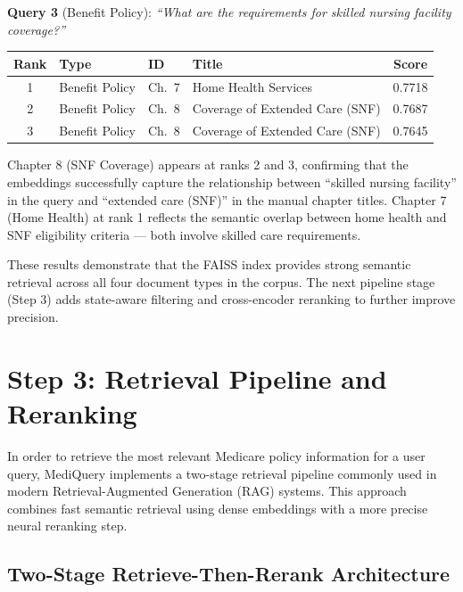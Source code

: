 \documentclass[10pt, letterpaper]{article}
\begin{document}
\textbf{Query 3} (Benefit Policy): \textit{``What are the requirements for skilled
nursing facility coverage?''}

\begin{table}[h]
\centering
\small
\begin{tabular}{@{}clllc@{}}
\toprule
\textbf{Rank} & \textbf{Type} & \textbf{ID} & \textbf{Title} & \textbf{Score} \\
\midrule
1 & Benefit Policy & Ch.\ 7  & Home Health Services           & 0.7718 \\
2 & Benefit Policy & Ch.\ 8  & Coverage of Extended Care (SNF) & 0.7687 \\
3 & Benefit Policy & Ch.\ 8  & Coverage of Extended Care (SNF) & 0.7645 \\
\bottomrule
\end{tabular}
\end{table}

Chapter 8 (SNF Coverage) appears at ranks 2 and 3, confirming that the embeddings
successfully capture the relationship between ``skilled nursing facility'' in the query
and ``extended care (SNF)'' in the manual chapter titles. Chapter 7 (Home Health) at
rank 1 reflects the semantic overlap between home health and SNF eligibility criteria
--- both involve skilled care requirements.

These results demonstrate that the FAISS index provides strong semantic retrieval
across all four document types in the corpus. The next pipeline stage (Step 3) adds
state-aware filtering and cross-encoder reranking to further improve precision.


\newpage
\section{Step 3: Retrieval Pipeline and Reranking}

In order to retrieve the most relevant Medicare policy information for a user query, MediQuery implements a two-stage retrieval pipeline commonly used in modern Retrieval-Augmented Generation (RAG) systems. This approach combines fast semantic retrieval using dense embeddings with a more precise neural reranking step.

\subsection{Two-Stage Retrieve-Then-Rerank Architecture}
\end{document}
